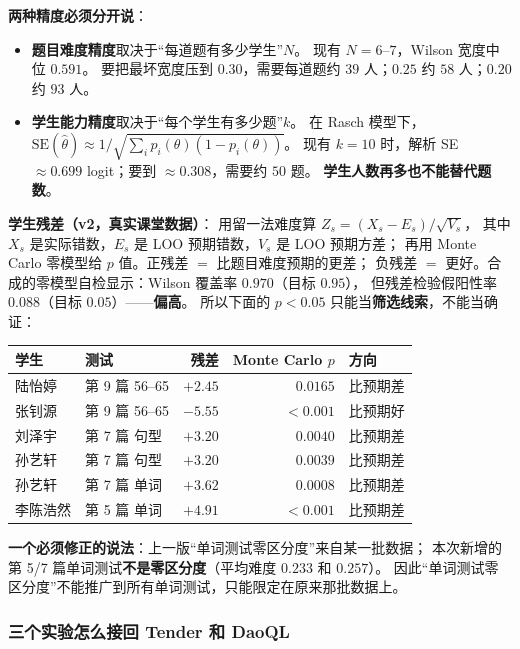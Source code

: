 \documentclass[UTF8,a4paper,11pt]{ctexart}
\begin{document}
\textbf{两种精度必须分开说}：

\begin{itemize}[leftmargin=2em]
\item \textbf{题目难度精度}取决于“每道题有多少学生”$N$。
现有 $N=6$--$7$，Wilson 宽度中位 $0.591$。
要把最坏宽度压到 $0.30$，需要每道题约 $39$ 人；$0.25$ 约 $58$ 人；$0.20$ 约 $93$ 人。
\item \textbf{学生能力精度}取决于“每个学生有多少题”$k$。
在 Rasch 模型下，$\mathrm{SE}(\hat\theta)\approx 1/\sqrt{\sum_i p_i(\theta)(1-p_i(\theta))}$。
现有 $k=10$ 时，解析 SE $\approx0.699$ logit；要到 $\approx0.308$，需要约 $50$ 题。
\textbf{学生人数再多也不能替代题数}。
\end{itemize}

\textbf{学生残差（v2，真实课堂数据）}：
用留一法难度算 $Z_{s}=(X_s-E_s)/\sqrt{V_s}$，
其中 $X_s$ 是实际错数，$E_s$ 是 LOO 预期错数，$V_s$ 是 LOO 预期方差；
再用 Monte Carlo 零模型给 $p$ 值。正残差 $=$ 比题目难度预期的更差；
负残差 $=$ 更好。合成的零模型自检显示：Wilson 覆盖率 $0.970$（目标 $0.95$），
但残差检验假阳性率 $0.088$（目标 $0.05$）——\textbf{偏高}。
所以下面的 $p<0.05$ 只能当\textbf{筛选线索}，不能当确证：

\begin{center}
\begin{longtable}{@{}llrrl@{}}
\toprule
\textbf{学生} & \textbf{测试} & \textbf{残差} & \textbf{Monte Carlo $p$} & \textbf{方向} \\
\midrule
陆怡婷 & 第 9 篇 56--65 & $+2.45$ & $0.0165$ & 比预期差 \\
张钊源 & 第 9 篇 56--65 & $-5.55$ & $<0.001$ & 比预期好 \\
刘泽宇 & 第 7 篇 句型 & $+3.20$ & $0.0040$ & 比预期差 \\
孙艺轩 & 第 7 篇 句型 & $+3.20$ & $0.0039$ & 比预期差 \\
孙艺轩 & 第 7 篇 单词 & $+3.62$ & $0.0008$ & 比预期差 \\
李陈浩然 & 第 5 篇 单词 & $+4.91$ & $<0.001$ & 比预期差 \\
\bottomrule
\end{longtable}
\end{center}

\textbf{一个必须修正的说法}：上一版“单词测试零区分度”来自某一批数据；
本次新增的第 5/7 篇单词测试\textbf{不是零区分度}（平均难度 $0.233$ 和 $0.257$）。
因此“单词测试零区分度”不能推广到所有单词测试，只能限定在原来那批数据上。

\subsubsection{三个实验怎么接回 Tender 和 DaoQL}
\end{document}
